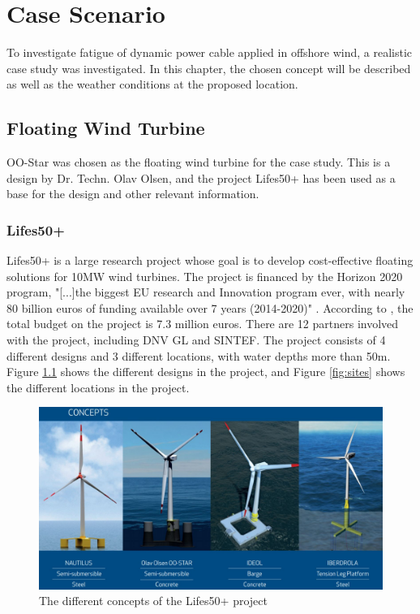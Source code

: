 \chapter{Case Scenario}
To investigate fatigue of dynamic power cable applied in offshore wind, a realistic case study was investigated. In this chapter, the chosen concept will be described as well as the weather conditions at the proposed location.  
\section{Floating Wind Turbine}
OO-Star was chosen as the floating wind turbine for the case study. This is a design by Dr. Techn. Olav Olsen, and the project Lifes50+ has been used as a base for the design and other relevant information. 
\subsection{Lifes50+}
Lifes50+ is a large research project whose goal is to develop cost-effective floating solutions for 10MW wind turbines. The project is financed by the Horizon 2020 program, "[...]the biggest EU research and Innovation program ever, with nearly 80 billion euros of funding available over 7 years (2014-2020)" \cite{Horizon2010}. According to \cite{Olavolsen}, the total budget on the project is 7.3 million euros. There are 12 partners involved with the project, including DNV GL and SINTEF. The project consists of 4 different designs and 3 different locations, with water depths more than 50m. Figure \ref{fig:concept} shows the different designs in the project, and Figure \ref{fig:sites} shows the different locations in the project. 

\begin{figure}[H]
\centering
\includegraphics[scale=0.4]{figures/concepts}
\caption[$\; \:$Concepts of the Lifes50+ project]{The different concepts of the Lifes50+ project \cite{Lifes50+} }
 \label{fig:concept}
\end{figure}


